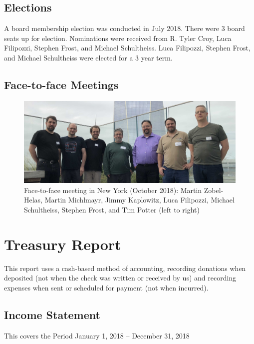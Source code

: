 \documentclass[a4paper]{report}
\begin{document}
\section{Elections}

A board membership election was conducted in July 2018.  There were 3
board seats up for election.  Nominations were received from R. Tyler
Croy, Luca Filipozzi, Stephen Frost, and Michael Schultheiss.  Luca
Filipozzi, Stephen Frost, and Michael Schultheiss were elected for a 3
year term.

\section{Face-to-face Meetings}

\begin{figure}[h]
\centering

\includegraphics[scale=0.14]{images/2018-october-f2f}

\caption{Face-to-face meeting in New York (October 2018): Martin
Zobel-Helas, Martin Michlmayr, Jimmy Kaplowitz, Luca Filipozzi, Michael
Schultheiss, Stephen Frost, and Tim Potter (left to right)}

\end{figure}

\chapter{Treasury Report}

This report uses a cash-based method of accounting, recording donations
when deposited (not when the check was written or received by us) and
recording expenses when sent or scheduled for payment (not when
incurred).

\section{Income Statement}

This covers the Period January 1, 2018 -- December 31, 2018
\end{document}
